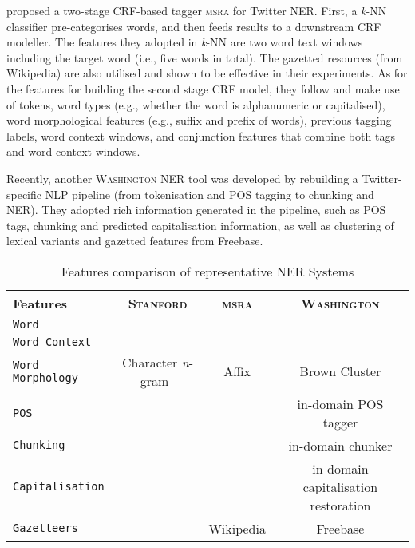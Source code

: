 \documentclass[11pt]{article}
\newcommand{\eg}{e.g.,\xspace}
\newcommand{\ie}{i.e.,\xspace}
\newcommand{\ngram}{\textit{n}-gram\ }
\newcommand{\stanford}{\textsc{Stanford}\xspace}
\newcommand{\washington}{\textsc{Washington}\xspace}
\newcommand{\msra}{\textsc{msra}\xspace}
\newcommand{\feature}[1]{\texttt{#1}\xspace}
\newcommand{\cmark}{\ding{51}}%
\newcommand{\xmark}{\ding{55}}%
\begin{document}
 proposed a two-stage CRF-based tagger \msra for Twitter NER.
First, a \textit{k}-NN classifier pre-categorises words, and then feeds results to a downstream CRF modeller.
The features they adopted in \textit{k}-NN are two word text windows including the target word (\ie five words in total).
The gazetted resources (from Wikipedia) are also utilised and shown to be effective in their experiments.
As for the features for building the second stage CRF model, they follow  and make use of tokens, word types (\eg whether the word is alphanumeric or capitalised), word morphological features (\eg suffix and prefix of words), previous tagging labels, word context windows, and conjunction features that combine both tags and word context windows.


Recently, another \washington NER tool \cite{emnlp11ritt} was developed by rebuilding a Twitter-specific NLP pipeline (from tokenisation and POS tagging to chunking and NER).
They adopted rich information generated in the pipeline, such as POS tags, chunking and predicted capitalisation information, as well as clustering of lexical variants \cite{cl92brow} and gazetted features from Freebase.

\begin{table*}[!htbp]
\begin{center}
\begin{tabular}{lccc}
\toprule
Features                                     & \stanford & \msra & \washington \\ 
\midrule
\feature{Word}                               & \cmark & \cmark & \cmark \\
\feature{Word Context}                       & \cmark & \cmark & \cmark \\
\feature{Word Morphology}                    & Character \ngram  & Affix & Brown Cluster \\
\feature{POS}                                & \cmark & \xmark & in-domain POS tagger\\
\feature{Chunking}                           & \xmark & \xmark & in-domain chunker \\
\feature{Capitalisation}                     & \xmark & \cmark & in-domain capitalisation restoration\\
\feature{Gazetteers}                         & \xmark & Wikipedia & Freebase \\
\bottomrule
\end{tabular}
\end{center}
\caption{Features comparison of representative NER Systems}
\label{tab:fea_comp}
\end{table*}
\end{document}
